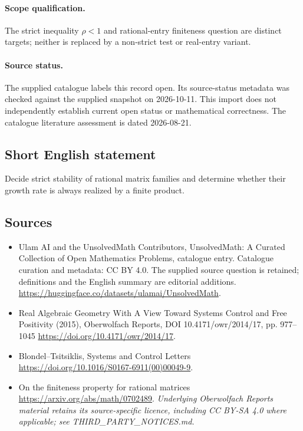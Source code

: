 \documentclass[11pt]{article}
\begin{document}
\paragraph{Scope qualification.}
The strict inequality $\rho<1$ and rational-entry finiteness question are distinct targets; neither is replaced by a non-strict test or real-entry variant.
\paragraph{Source status.}
The supplied catalogue labels this record open. Its source-status metadata was checked against the supplied snapshot on 2026-10-11. This import does not independently establish current open status or mathematical correctness. The catalogue literature assessment is dated 2026-08-21.
\subsection{Short English statement}
Decide strict stability of rational matrix families and determine whether their growth rate is always realized by a finite product.
\subsection{Sources}
\begin{itemize}
\item[S1] Ulam AI and the UnsolvedMath Contributors, UnsolvedMath: A Curated Collection of Open Mathematics Problems, catalogue entry. Catalogue curation and metadata: CC BY 4.0. The supplied source question is retained; definitions and the English summary are editorial additions.
\url{https://huggingface.co/datasets/ulamai/UnsolvedMath}.
\item[S2] Real Algebraic Geometry With A View Toward Systems Control and Free Positivity (2015), Oberwolfach Reports, DOI 10.4171/owr/2014/17, pp. 977--1045
\url{https://doi.org/10.4171/owr/2014/17}.
\item[S3] Blondel--Tsitsiklis, Systems and Control Letters
\url{https://doi.org/10.1016/S0167-6911(00)00049-9}.
\item[S4] On the finiteness property for rational matrices
\url{https://arxiv.org/abs/math/0702489}.
\textit{Underlying Oberwolfach Reports material retains its source-specific licence, including CC BY-SA 4.0 where applicable; see THIRD\_PARTY\_NOTICES.md.}
\end{itemize}
\end{document}
